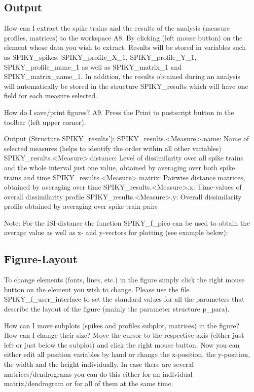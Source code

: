 \documentclass[10pt,twocolumn]{elsart5p}
\begin{document}
\subsection{\label{ss:Output} Output}

How can I extract the spike trains and the results of the analysis (measure profiles, matrices) to the workspace
A8.  By clicking (left mouse button) on the element whose data you wish to extract. Results will be stored in variables such as SPIKY\_spikes, SPIKY\_profile\_X\_1, SPIKY\_profile\_Y\_1, SPIKY\_profile\_name\_1 as well as SPIKY\_matrix\_1 and SPIKY\_matrix\_name\_1. In addition, the results obtained during an analysis will automatically be stored in the structure SPIKY\_results which will have one field for each measure selected. 

How do I save/print figures?
A9. Press the Print to postscript button in the toolbar (left upper corner).

Output (Structure SPIKY\_results'):
SPIKY\_results.<Measure>.name:     Name of selected measures (helps to identify the order within all other variables)
SPIKY\_results.<Measure>.distance: Level of dissimilarity over all spike trains and the whole interval
                            just one value, obtained by averaging over both spike trains and time
SPIKY\_results.<Measure>.matrix:   Pairwise distance matrices, obtained by averaging over time
SPIKY\_results.<Measure>.x:        Time-values of overall dissimilarity profile
SPIKY\_results.<Measure>.y:        Overall dissimilarity profile obtained by averaging over spike train pairs

Note: For the ISI-distance the function SPIKY\_f\_pico can be used to obtain the average value as well as
x- and y-vectors for plotting (see example below):


\subsection{\label{ss:Figure-Layout} Figure-Layout}

To change elements (fonts, lines, etc.) in the figure simply click the right mouse button on the element you wish to change. Please use the file SPIKY\_f\_user\_interface to set the standard values for all the parameters that describe the layout of the figure (mainly the parameter structure p\_para).

How can I move subplots (spikes and profiles subplot, matrices) in the figure? How can I change their size?
Move the cursor to the respective axis (either just left or just below the subplot) and click the right mouse button. Now you can either edit all position variables by hand or change the x-position, the y-position, the width and the height individually. In case there are several matrices/dendrograms you can do this either for an individual matrix/dendrogram or for all of them at the same time.
\end{document}
